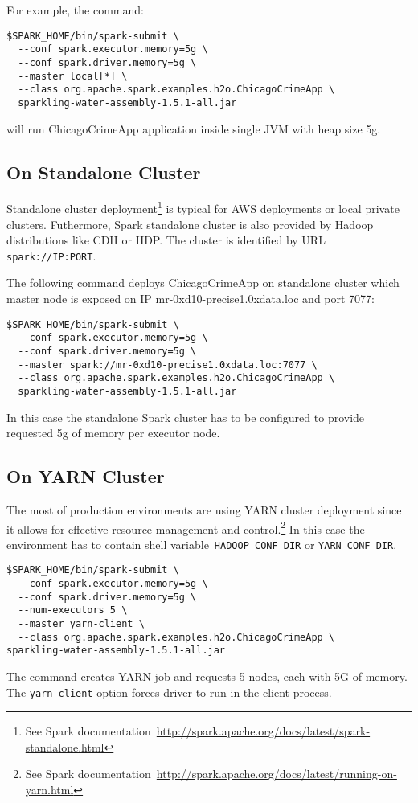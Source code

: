 For example, the command:
\begin{lstlisting}[style=Bash]
$SPARK_HOME/bin/spark-submit \ 
  --conf spark.executor.memory=5g \
  --conf spark.driver.memory=5g \
  --master local[*] \
  --class org.apache.spark.examples.h2o.ChicagoCrimeApp \
  sparkling-water-assembly-1.5.1-all.jar  
\end{lstlisting}
will run ChicagoCrimeApp application inside single JVM with heap size 5g.

\subsection{On Standalone Cluster}
Standalone cluster deployment\footnote{See Spark documentation~\url{http://spark.apache.org/docs/latest/spark-standalone.html}} is typical for AWS deployments or local private clusters. Futhermore, Spark standalone cluster is also provided by Hadoop distributions like CDH or HDP. The cluster is identified by URL \texttt{spark://IP:PORT}.

The following command deploys ChicagoCrimeApp on standalone cluster which master node is exposed on IP mr-0xd10-precise1.0xdata.loc and port 7077:

\begin{lstlisting}[style=Bash]
$SPARK_HOME/bin/spark-submit \ 
  --conf spark.executor.memory=5g \
  --conf spark.driver.memory=5g \
  --master spark://mr-0xd10-precise1.0xdata.loc:7077 \
  --class org.apache.spark.examples.h2o.ChicagoCrimeApp \
  sparkling-water-assembly-1.5.1-all.jar  
\end{lstlisting}

In this case the standalone Spark cluster has to be configured to provide requested 5g of memory per executor node. 

\subsection{On YARN Cluster}
The most of production environments are using YARN cluster deployment since it allows for effective resource management and control.\footnote{See Spark documentation~\url{http://spark.apache.org/docs/latest/running-on-yarn.html}} 
In this case the environment has to contain shell variable~\texttt{HADOOP\_CONF\_DIR} or \texttt{YARN\_CONF\_DIR}.

\begin{lstlisting}[style=Bash]
$SPARK_HOME/bin/spark-submit \ 
  --conf spark.executor.memory=5g \
  --conf spark.driver.memory=5g \
  --num-executors 5 \
  --master yarn-client \
  --class org.apache.spark.examples.h2o.ChicagoCrimeApp \
sparkling-water-assembly-1.5.1-all.jar  
\end{lstlisting}

The command creates YARN job and requests 5 nodes, each with 5G of memory. The \texttt{yarn-client} option forces driver to run in the client process.
